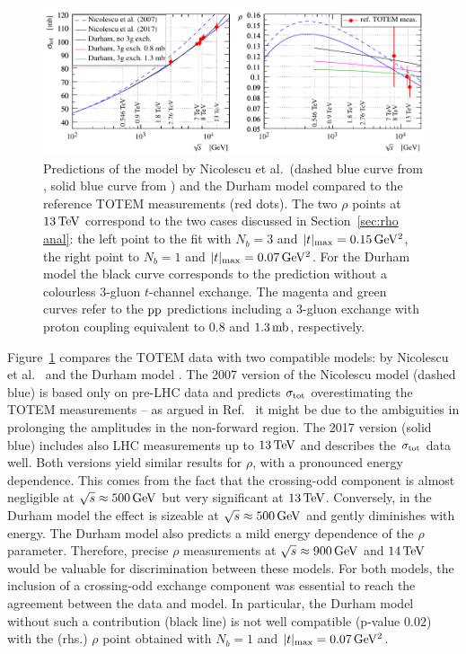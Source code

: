 \begin{figure}
\vskip-5mm
\begin{center}
\includegraphics{fig/matching_models_si_tot_rho.pdf}
\caption{%
Predictions of the model by Nicolescu et al.~(dashed blue curve from \cite{nicolescu-2007}, solid blue curve from \cite{nicolescu-2017}) and the Durham model \cite{durham-2017-note} compared to the reference TOTEM measurements (red dots). The two $\rho$ points at $13\,{\rm TeV}$ correspond to the two cases discussed in Section~\ref{sec:rho anal}: the left point to the fit with $N_b=3$ and $|t|_{\rm max} = 0.15\,{\rm GeV^2}$, the right point to $N_b=1$ and $|t|_{\rm max} = 0.07\,{\rm GeV^2}$. For the Durham model the black curve corresponds to the prediction without a colourless 3-gluon $t$-channel exchange. The magenta and green curves refer to the $\rm pp$ predictions including a 3-gluon exchange with proton coupling equivalent to $0.8$ and $1.3\,{\rm mb}$, respectively.
}
\label{fig:match models}
\end{center}
\end{figure}

Figure~\ref{fig:match models} compares the TOTEM data with two compatible models: by Nicolescu et al.~\cite{nicolescu-2007,nicolescu-2017} and the Durham model \cite{durham-2017-note}. The 2007 version of the Nicolescu model (dashed blue) is based only on pre-LHC data and predicts $\sigma_{\rm tot}$ overestimating the TOTEM measurements -- as argued in Ref.~\cite{nicolescu-2017} it might be due to the ambiguities in prolonging the amplitudes in the non-forward region. The 2017 version (solid blue) includes also LHC measurements up to $13\,{\rm TeV}$ and describes the $\sigma_{\rm tot}$ data well. Both versions yield similar results for $\rho$, with a pronounced energy dependence. This comes from the fact that the crossing-odd component is almost negligible at $\sqrt s \approx 500\,{\rm GeV}$ but very significant at $13\,{\rm TeV}$. Conversely, in the Durham model the effect is sizeable at $\sqrt s \approx 500\,{\rm GeV}$ and gently diminishes with energy. The Durham model also predicts a mild energy dependence of the $\rho$ parameter. Therefore, precise $\rho$ measurements at $\sqrt s \approx 900\,{\rm GeV}$ and $14\,{\rm TeV}$ would be valuable for discrimination between these models. For both models, the inclusion of a crossing-odd exchange component was essential to reach the agreement between the data and model. In particular, the Durham model without such a contribution (black line) is not well compatible (p-value $0.02$) with the (rhs.) $\rho$ point obtained with $N_b=1$ and $|t|_{\rm max} = 0.07\,{\rm GeV^2}$.
